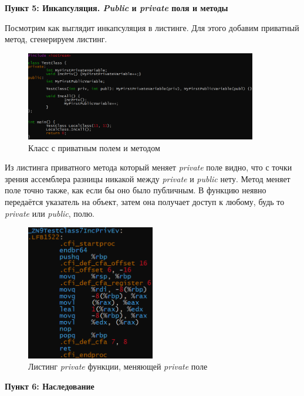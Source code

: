 \documentclass[a4paper,12pt]{article}
\begin{document}
\textbf{Пункт 5: Инкапсуляция. \textit{Public} и \textit{private} поля и методы}

Посмотрим как выглядит инкапсуляция в листинге. Для этого добавим приватный метод, сгенерируем листинг.
\begin{figure}[H]\label{fig: Приватные поля и методы код}
    \centering
    \includegraphics[width = 0.9\textwidth]{Приватные публичные поля код.png}
    \caption{Класс с приватным полем и методом}
\end{figure}
Из листинга приватного метода который меняет \textit{private} поле  видно, что с точки зрения ассемблера разницы никакой между \textit{private} и \textit{public} нету. Метод меняет поле точно также, как если бы оно было публичным. В функцию неявно передаётся указатель на объект, затем она получает доступ к любому, будь то \textit{private} или \textit{public}, полю.    
\begin{figure}[H]\label{fig: Приватные поля и методы листинг}
    \centering
    \includegraphics[width = 0.5\textwidth]{Приватные публичные поля листинг.png}
    \caption{Листинг \textit{private} функции, меняющей \textit{private} поле}
\end{figure}

\textbf{Пункт 6: Наследование}
\end{document}
